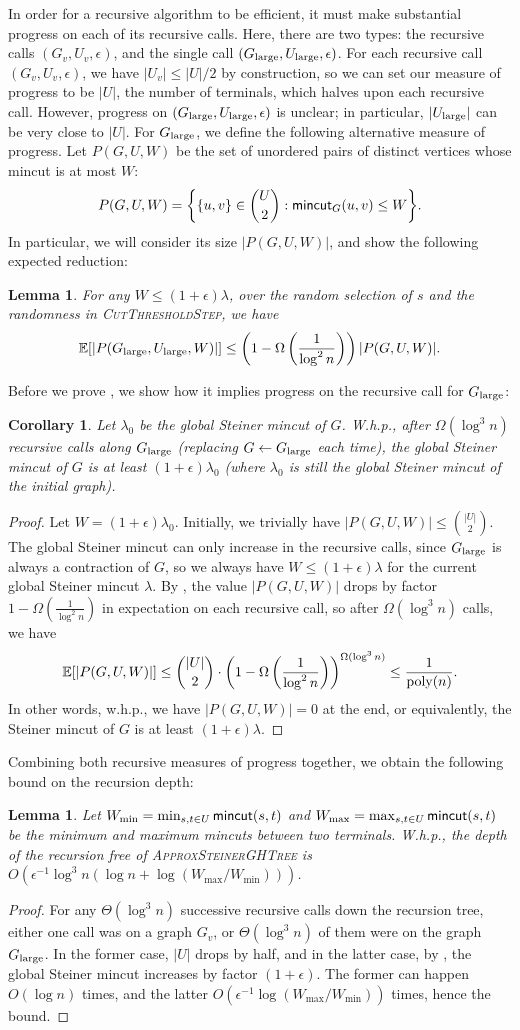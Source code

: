 \documentclass{article}
\newcommand{\f}{\frac}
\newcommand{\cd}{\cdot}
\newcommand{\bn}{\binom}
\newcommand{\logn}{\log n}
\newcommand{\inv}{^{-1}}
\newcommand{\e}{\epsilon}
\newcommand{\la}{\lambda}
\newcommand{\Om}{\Omega}
\newcommand{\Th}{\Theta}
\newcommand{\E}{\mathbb E}
\newcommand{\1}{\mathbbm 1}
\newcommand{\poly}{\textup{poly}}
\newcommand{\lp}{\left(}
\newcommand{\rp}{\right)}
\newtheorem{lemma}[theorem]{Lemma}
\newtheorem{corollary}[theorem]{Corollary}
\newcommand{\BL}{\begin{lemma}}
\newcommand{\EL}{\end{lemma}}
\newcommand{\BC}{\begin{corollary}}
\newcommand{\EC}{\end{corollary}}
\newcommand{\BP}{\begin{proof}}
\newcommand{\EP}{\end{proof}}
\newcommand{\leml}[1]{\label{lem:#1}}
\newcommand{\lem}[1]{\Cref{lem:#1}}
\newcommand{\corl}[1]{\label{cor:#1}}
\newcommand{\cor}[1]{\Cref{cor:#1}}
\newcommand{\mincut}{\textsf{\textup{mincut}}}
\newcommand{\lar}{{\textup{large}}}
\begin{document}
In order for a recursive algorithm to be efficient, it must make substantial progress on each of its recursive calls. Here, there are two types: the recursive calls $(G_v,U_v,\e)$, and the single call $(G_\lar,U_\lar,\e)$. For each recursive call $(G_v,U_v,\e)$, we have $|U_v|\le|U|/2$ by construction, so we can set our measure of progress to be $|U|$, the number of terminals, which halves upon each recursive call.
However, progress on $(G_\lar,U_\lar,\e)$ is unclear; in particular, $|U_\lar|$ can be very close to $|U|$. For $G_\lar$, we define the following alternative measure of progress. Let $P(G,U,W)$ be the set of unordered pairs of distinct vertices whose mincut is at most $W$:
\[ P(G,U,W) = \bigg\{ \{u,v\}\in\bn U2:\mincut_G(u,v)\le W \bigg\} .\]
In particular, we will consider its size $|P(G,U,W)|$, and show the following expected reduction:

\BL\leml{P}
For any $W\le(1+\e)\la$, over the random selection of $s$ and the randomness in \textsc{CutThresholdStep}, we have
\[ \E[|P(G_\lar,U_\lar,W)|] \le \lp1-\Om\lp\f1{\log^2n}\rp\rp|P(G,U,W)| .\]
\EL

Before we prove \lem{P}, we show how it implies progress on the recursive call for $G_\lar$:
\BC\corl{mincut-increase}
Let $\la_0$ be the global Steiner mincut of $G$.
W.h.p., after $\Om(\log^3n)$ recursive calls along $G_\lar$ (replacing $G\gets G_\lar$ each time), the global Steiner mincut of $G$ is at least $(1+\e)\la_0$ (where $\la_0$ is still the global Steiner mincut of the initial graph).
\EC
\BP
Let $W=(1+\e)\la_0$.
Initially, we trivially have $|P(G,U,W)|\le\bn{|U|}2$. The global Steiner mincut can only increase in the recursive calls, since $G_\lar$ is always a contraction of $G$, so we always have $W\le(1+\e)\la$ for the current global Steiner mincut $\la$. By \lem{P}, the value $|P(G,U,W)|$ drops by factor $1-\Om(\f1{\log^2n})$ in expectation on each recursive call, so after $\Om(\log^3n)$ calls, we have
\[ \E[|P(G,U,W)|]\le\bn{|U|}2\cd\lp1-\Om\lp\f1{\log^2n}\rp\rp^{\Om(\log^3n)}\le\f1{\poly(n)} .\]
In other words, w.h.p., we have $|P(G,U,W)|=0$ at the end, or equivalently, the Steiner mincut of $G$ is at least $(1+\e)\la$.
\EP

Combining both recursive measures of progress together, we obtain the following bound on the recursion depth:
\BL
Let $W_{\min}=\min_{s,t\in U}\mincut(s,t)$ and $W_{\max}=\max_{s,t\in U}\mincut(s,t)$ be the minimum and maximum mincuts between two terminals. W.h.p., the depth of the recursion free of \textsc{ApproxSteinerGHTree} is $O(\e\inv\log^3n(\logn+\log(W_{\max}/W_{\min})))$.
\EL
\BP
For any $\Th(\log^3n)$ successive recursive calls down the recursion tree, either one call was on a graph $G_v$, or $\Th(\log^3n)$ of them were on the graph $G_\lar$. In the former case, $|U|$ drops by half, and in the latter case, by \cor{mincut-increase}, the global Steiner mincut increases by factor $(1+\e)$. The former can happen $O(\logn)$ times, and the latter $O(\e\inv\log(W_{\max}/W_{\min}))$ times, hence the bound.
\EP
\end{document}
